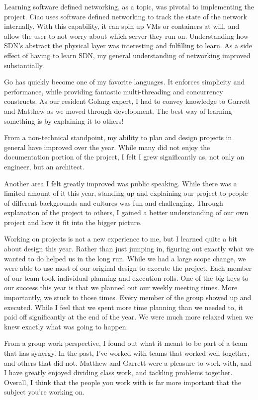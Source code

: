 \documentclass[10pt,onecolumn,journal,draftclsnofoot]{IEEEtran}
\begin{document}
Learning software defined networking, as a topic, was pivotal to implementing the project. Ciao uses software defined networking to track the state of the network internally. With this capability, it can spin up VMs or containers at will, and allow the user to not worry about which server they run on. Understanding how SDN's abstract the physical layer was interesting and fulfilling to learn. As a side effect of having to learn SDN, my general understanding of networking improved substantially.

Go has quickly become one of my favorite languages. It enforces simplicity and performance, while providing fantastic multi-threading and concurrency constructs. As our resident Golang expert, I had to convey knowledge to Garrett and Matthew as we moved through development. The best way of learning something is by explaining it to others!

From a non-technical standpoint, my ability to plan and design projects in general have improved over the year. While many did not enjoy the documentation portion of the project, I felt I grew significantly as, not only an engineer, but an architect. 

Another area I felt greatly improved was public speaking. While there was a limited amount of it this year, standing up and explaining our project to people of different backgrounds and cultures was fun and challenging. Through explanation of the project to others, I gained a better understanding of our own project and how it fit into the bigger picture.

Working on projects is not a new experience to me, but I learned quite a bit about design this year. Rather than just jumping in, figuring out exactly what we wanted to do helped us in the long run. While we had a large scope change, we were able to use most of our original design to execute the project. Each member of our team took individual planning and execution rolls. One of the big keys to our success this year is that we planned out our weekly meeting times. More importantly, we stuck to those times. Every member of the group showed up and executed. While I feel that we spent more time planning than we needed to, it paid off significantly at the end of the year. We were much more relaxed when we knew exactly what was going to happen.

From a group work perspective, I found out what it meant to be part of a team that has synergy. In the past, I've worked with teams that worked well together, and others that did not. Matthew and Garrett were a pleasure to work with, and I have greatly enjoyed dividing class work, and tackling problems together. Overall, I think that the people you work with is far more important that the subject you're working on.
\end{document}
